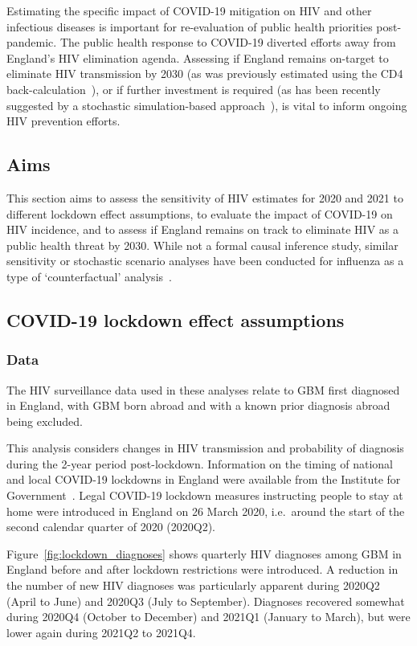 Estimating the specific impact of COVID-19 mitigation on HIV and other infectious diseases is important for re-evaluation of public health priorities post-pandemic. The public health response to COVID-19 diverted efforts away from England's HIV elimination agenda. Assessing if England remains on-target to eliminate HIV transmission by 2030 (as was previously estimated using the CD4 back-calculation~\parencite{Brizzi2021-zl}), or if further investment is required (as has been recently suggested by a stochastic simulation-based approach~\parencite{Cambiano2023-lj}), is vital to inform ongoing HIV prevention efforts.

\subsection{Aims}

This section aims to assess the sensitivity of HIV estimates for 2020 and 2021 to different lockdown effect assumptions, to evaluate the impact of COVID-19 on HIV incidence, and to assess if England remains on track to eliminate HIV as a public health threat by 2030. While not a formal causal inference study, similar sensitivity or stochastic scenario analyses have been conducted for influenza as a type of `counterfactual' analysis~\parencite{Wu2017-ts, Cooper2006-nl}.

\subsection{COVID-19 lockdown effect assumptions}

\subsubsection{Data}

The HIV surveillance data used in these analyses relate to GBM first diagnosed in England, with GBM born abroad and with a known prior diagnosis abroad being excluded.

This analysis considers changes in HIV transmission and probability of diagnosis during the 2-year period post-lockdown. Information on the timing of national and local COVID-19 lockdowns in England were available from the Institute for Government~\parencite{Institute_for_Government2022-zw}. Legal COVID-19 lockdown measures instructing people to stay at home were introduced in England on 26 March 2020, i.e.\ around the start of the second calendar quarter of 2020 (2020Q2).

Figure~\ref{fig:lockdown_diagnoses} shows quarterly HIV diagnoses among GBM in England before and after lockdown restrictions were introduced. A reduction in the number of new HIV diagnoses was particularly apparent during 2020Q2 (April to June) and 2020Q3 (July to September). Diagnoses recovered somewhat during 2020Q4 (October to December) and 2021Q1 (January to March), but were lower again during 2021Q2 to 2021Q4.

